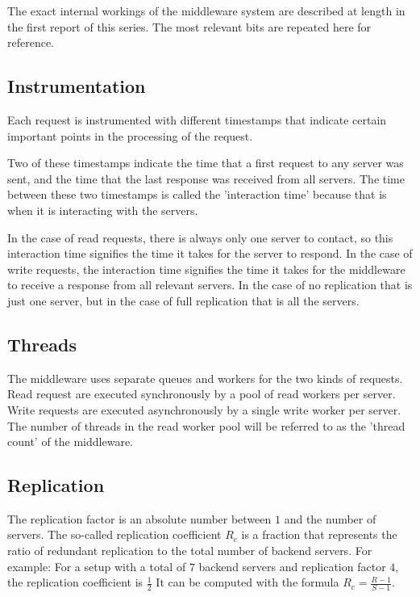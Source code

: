 \documentclass[11pt]{article}
\begin{document}
The exact internal workings of the middleware system are described at length in the first report of this series.
The most relevant bits are repeated here for reference.  


\subsection{Instrumentation}

Each request is instrumented with different timestamps that indicate certain important points in the processing of the request.

Two of these timestamps indicate the time that a first request to any server was sent, and the time that the last response was received from all servers.
The time between these two timestamps is called the 'interaction time' because that is when it is interacting with the servers.

In the case of read requests, there is always only one server to contact, so this interaction time signifies the time it takes for the server to respond.
In the case of write requests, the interaction time signifies the time it takes for the middleware to receive a response from all relevant servers.
In the case of no replication that is just one server, but in the case of full replication that is all the servers.

\subsection{Threads}

The middleware uses separate queues and workers for the two kinds of requests.
Read request are executed synchronously by a pool of read workers per server.
Write requests are executed asynchronously by a single write worker per server.
The number of threads in the read worker pool will be referred to as the 'thread count' of the middleware.

\subsection{Replication}

The replication factor is an absolute number between $1$ and the number of servers.
The so-called replication coefficient $R_c$ is a fraction that represents the ratio of redundant replication to the total number of backend servers. For example: For a setup with a total of $7$ backend servers and replication factor $4$, the replication coefficient is $\frac{1}{2}$
It can be computed with the formula $R_c = \frac{R - 1}{S - 1}$.
\end{document}
